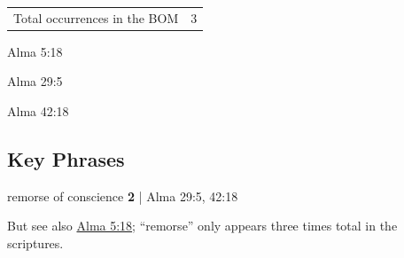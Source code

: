 		\begin{tabular}{ll}
			Total occurrences in the BOM & 3
		\end{tabular}
		
		\begin{compactdesc}
			\item[Alma 5:18]
			\item[Alma 29:5]
			\item[Alma 42:18]
		\end{compactdesc}
		
	
		
		
	
		
		
\subsection{Key Phrases} %
	\label{REMORSE-PHRASES}

	\begin{compactdesc}
		\item[remorse of conscience] \textbf{2} | Alma 29:5, 42:18
			\begin{compactitem}
				\item But see also \hyperref[ALMA-5-18]{Alma 5:18}; ``remorse'' only appears three times total in the scriptures.
			\end{compactitem}
	\end{compactdesc}
	

